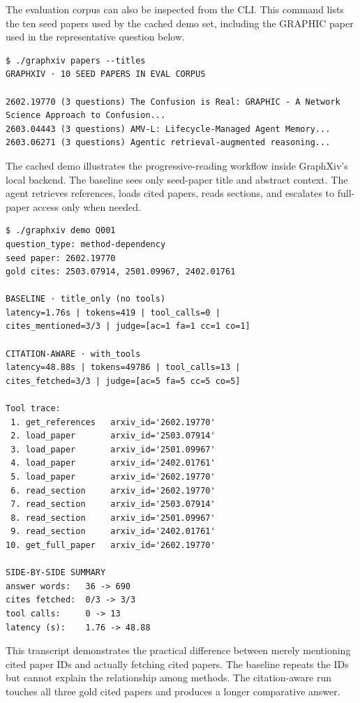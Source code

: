 \documentclass[10pt]{article}
\begin{document}
The evaluation corpus can also be inspected from the CLI. This command lists the ten seed papers used by the cached demo set, including the GRAPHIC paper used in the representative question below.

\begin{lstlisting}[style=terminal,caption={Seed papers available for demo questions.}]
$ ./graphxiv papers --titles
GRAPHXIV · 10 SEED PAPERS IN EVAL CORPUS

2602.19770 (3 questions) The Confusion is Real: GRAPHIC - A Network
Science Approach to Confusion...
2603.04443 (3 questions) AMV-L: Lifecycle-Managed Agent Memory...
2603.06271 (3 questions) Agentic retrieval-augmented reasoning...
\end{lstlisting}

The cached demo illustrates the progressive-reading workflow inside GraphXiv's local backend. The baseline sees only seed-paper title and abstract context. The agent retrieves references, loads cited papers, reads sections, and escalates to full-paper access only when needed.

\begin{lstlisting}[style=terminal,caption={Citation-aware cached replay for question Q001.}]
$ ./graphxiv demo Q001
question_type: method-dependency
seed paper: 2602.19770
gold cites: 2503.07914, 2501.09967, 2402.01761

BASELINE · title_only (no tools)
latency=1.76s | tokens=419 | tool_calls=0 |
cites_mentioned=3/3 | judge=[ac=1 fa=1 cc=1 co=1]

CITATION-AWARE · with_tools
latency=48.88s | tokens=49786 | tool_calls=13 |
cites_fetched=3/3 | judge=[ac=5 fa=5 cc=5 co=5]

Tool trace:
 1. get_references   arxiv_id='2602.19770'
 2. load_paper       arxiv_id='2503.07914'
 3. load_paper       arxiv_id='2501.09967'
 4. load_paper       arxiv_id='2402.01761'
 5. load_paper       arxiv_id='2602.19770'
 6. read_section     arxiv_id='2602.19770'
 7. read_section     arxiv_id='2503.07914'
 8. read_section     arxiv_id='2501.09967'
 9. read_section     arxiv_id='2402.01761'
10. get_full_paper   arxiv_id='2602.19770'

SIDE-BY-SIDE SUMMARY
answer words:   36 -> 690
cites fetched:  0/3 -> 3/3
tool calls:     0 -> 13
latency (s):    1.76 -> 48.88
\end{lstlisting}

This transcript demonstrates the practical difference between merely mentioning cited paper IDs and actually fetching cited papers. The baseline repeats the IDs but cannot explain the relationship among methods. The citation-aware run touches all three gold cited papers and produces a longer comparative answer.
\end{document}

